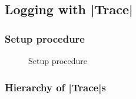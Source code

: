

\subsection{Logging with |Trace|}

\subsubsection{Setup procedure}

\begin{figure}[ht]
\caption{Setup procedure}\label{fig:setup}
\end{figure}

\subsubsection{Hierarchy of |Trace|s}
